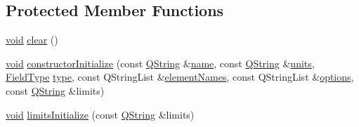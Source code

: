 \subsection*{\-Protected \-Member \-Functions}
\begin{DoxyCompactItemize}
\item 
\hyperlink{group___u_a_v_objects_plugin_ga444cf2ff3f0ecbe028adce838d373f5c}{void} \hyperlink{group___u_a_v_objects_plugin_ga3d25ad42d17576d9c6218bd1c65345a9}{clear} ()
\item 
\hyperlink{group___u_a_v_objects_plugin_ga444cf2ff3f0ecbe028adce838d373f5c}{void} \hyperlink{group___u_a_v_objects_plugin_ga8c808af230791ca079eca575c6c6c1ae}{constructor\-Initialize} (const \hyperlink{group___u_a_v_objects_plugin_gab9d252f49c333c94a72f97ce3105a32d}{\-Q\-String} \&\hyperlink{group___u_a_v_objects_plugin_ga9909de3b60e1a954d7356cfc61357b30}{name}, const \hyperlink{group___u_a_v_objects_plugin_gab9d252f49c333c94a72f97ce3105a32d}{\-Q\-String} \&\hyperlink{group___u_a_v_objects_plugin_ga1ecf5fdaab2ac408b67623d5d75368c5}{units}, \hyperlink{group___u_a_v_objects_plugin_ga74498368bc91f3ed74beacb096744cf3}{\-Field\-Type} \hyperlink{group___u_a_v_objects_plugin_gad84e6c3a333d2c62b5159936e42fb737}{type}, const \-Q\-String\-List \&\hyperlink{group___u_a_v_objects_plugin_ga5849334da3325c4cac8625bb5910d57d}{element\-Names}, const \-Q\-String\-List \&\hyperlink{group___u_a_v_objects_plugin_ga97fe1c3ed2d74eb06ea7e24abf4ce09c}{options}, const \hyperlink{group___u_a_v_objects_plugin_gab9d252f49c333c94a72f97ce3105a32d}{\-Q\-String} \&limits)
\item 
\hyperlink{group___u_a_v_objects_plugin_ga444cf2ff3f0ecbe028adce838d373f5c}{void} \hyperlink{group___u_a_v_objects_plugin_ga7ceda7a3dfdcca81d80ed887485c4b76}{limits\-Initialize} (const \hyperlink{group___u_a_v_objects_plugin_gab9d252f49c333c94a72f97ce3105a32d}{\-Q\-String} \&limits)
\end{DoxyCompactItemize}
